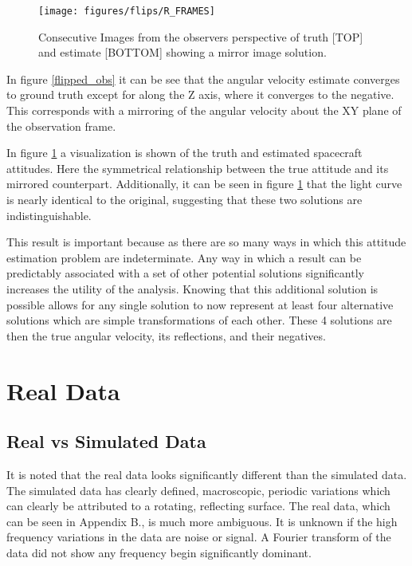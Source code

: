 \begin{figure}[ht]
	\begin{center}
		\texttt{[image: figures/flips/R\_FRAMES]}
	\end{center}
	\caption{Consecutive Images from the observers perspective of truth [TOP] and estimate [BOTTOM] showing a mirror image solution.}
	\label{flipped_frames}
\end{figure}

In figure \ref{flipped_obs} it can be see that the angular velocity estimate converges to ground truth except for along the Z axis, where it converges to the negative. This corresponds with a mirroring of the angular velocity about the XY plane of the observation frame.

In figure \ref{flipped_frames} a visualization is shown of the truth and estimated spacecraft attitudes. Here the symmetrical relationship between the true attitude and its mirrored counterpart. Additionally, it can be seen in figure \ref{flipped_frames} that the light curve is nearly identical to the original, suggesting that these two solutions are indistinguishable.

This result is important because as there are so many ways in which this attitude estimation problem are indeterminate. Any way in which a result can be predictably associated with a set of other potential solutions significantly increases the utility of the analysis. Knowing that this additional solution is possible allows for any single solution to now represent at least four alternative solutions which are simple transformations of each other. These 4 solutions are then the true angular velocity, its reflections, and their negatives.

\section{Real Data}

\subsection{Real vs Simulated Data}

It is noted that the real data looks significantly different than the simulated data. The simulated data has clearly defined, macroscopic, periodic variations which can clearly be attributed to a rotating, reflecting surface. The real data, which can be seen in Appendix B., is much more ambiguous. It is unknown if the high frequency variations in the data are noise or signal. A Fourier transform of the data did not show any frequency begin significantly dominant.

